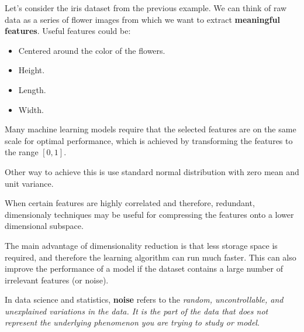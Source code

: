\documentclass[../machine_learning_scikit.tex]{subfiles}
\begin{document}
    \begin{exa}
        Let's consider the iris dataset from the previous example. We can think of raw data as a series of flower images from which we want to extract \textbf{meaningful features}. Useful features could be:
        \begin{itemize}
            \item Centered around the color of the flowers.
            \item Height.
            \item Length.
            \item Width.
        \end{itemize}
    \end{exa}

    \begin{obs}
        Many machine learning models require that the selected features are on the same scale for optimal performance, which is achieved by transforming the features to the range $[0,1]$.

        Other way to achieve this is use standard normal distribution with zero mean and unit variance.
    \end{obs}

    \begin{obs}
        When certain features are highly correlated and therefore, redundant, dimensionaly techniques may be useful for compressing the features onto a lower dimensional subspace.
    \end{obs}

    The main advantage of dimensionality reduction is that less storage space is required, and therefore the learning algorithm can run much faster. This can also improve the performance of a model if the dataset contains a large number of irrelevant features (or noise).

    \begin{mydef}
        In data science and statistics, \textbf{noise} refers to the \textit{random, uncontrollable, and unexplained variations in the data. It is the part of the data that does not represent the underlying phenomenon you are trying to study or model}.
    \end{mydef}
\end{document}
